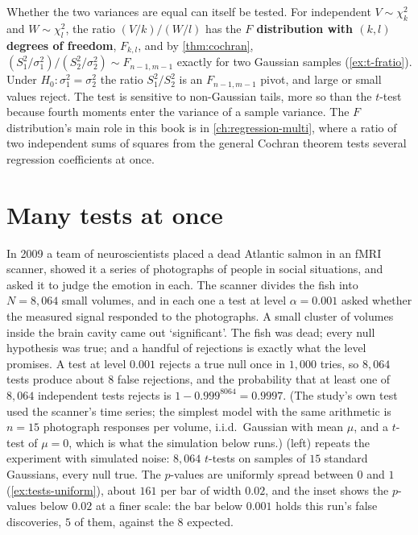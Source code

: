 \begin{remark}
Whether the two variances are equal can itself be tested.
For independent $V \sim \chi^2_k$ and $W \sim \chi^2_l$, the ratio $(V/k)/(W/l)$ has the \textbf{$F$ distribution with $(k, l)$ degrees of freedom}, $F_{k,l}$, and by \cref{thm:cochran}, $(S_1^2/\sigma_1^2)/(S_2^2/\sigma_2^2) \sim F_{n-1, m-1}$ exactly for two Gaussian samples (\cref{ex:t-fratio}).
Under $H_0: \sigma_1^2 = \sigma_2^2$ the ratio $S_1^2/S_2^2$ is an $F_{n-1,m-1}$ pivot, and large or small values reject.
The test is sensitive to non-Gaussian tails, more so than the $t$-test because fourth moments enter the variance of a sample variance.
The $F$ distribution's main role in this book is in \cref{ch:regression-multi}, where a ratio of two independent sums of squares from the general Cochran theorem tests several regression coefficients at once.
\end{remark}

\section{Many tests at once}
\label{sec:t-multiple}

In 2009 a team of neuroscientists placed a dead Atlantic salmon in an fMRI scanner, showed it a series of photographs of people in social situations, and asked it to judge the emotion in each.
The scanner divides the fish into $N = 8{,}064$ small volumes, and in each one a test at level $\alpha = 0.001$ asked whether the measured signal responded to the photographs.
A small cluster of volumes inside the brain cavity came out `significant'.
The fish was dead; every null hypothesis was true; and a handful of rejections is exactly what the level promises.
A test at level $0.001$ rejects a true null once in $1{,}000$ tries, so $8{,}064$ tests produce about $8$ false rejections, and the probability that at least one of $8{,}064$ independent tests rejects is $1 - 0.999^{8064} = 0.9997$.
(The study's own test used the scanner's time series; the simplest model with the same arithmetic is $n = 15$ photograph responses per volume, i.i.d.\ Gaussian with mean $\mu$, and a $t$-test of $\mu = 0$, which is what the simulation below runs.)
 (left) repeats the experiment with simulated noise: $8{,}064$ $t$-tests on samples of $15$ standard Gaussians, every null true.
The $p$-values are uniformly spread between $0$ and $1$ (\cref{ex:tests-uniform}), about $161$ per bar of width $0.02$, and the inset shows the $p$-values below $0.02$ at a finer scale: the bar below $0.001$ holds this run's false discoveries, $5$ of them, against the $8$ expected.

